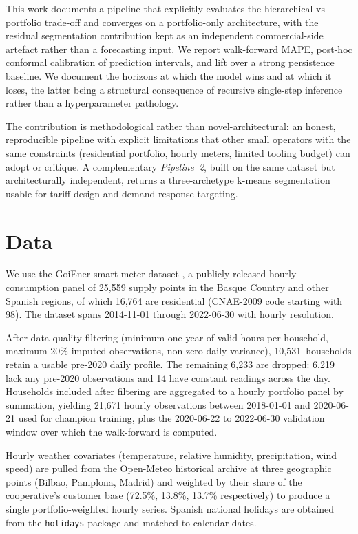 \documentclass[11pt]{article}
\begin{document}
This work documents a pipeline that explicitly evaluates the
hierarchical-vs-portfolio trade-off and converges on a portfolio-only
architecture, with the residual segmentation contribution kept as an
independent commercial-side artefact rather than a forecasting input. We
report walk-forward MAPE, post-hoc conformal calibration of prediction
intervals, and lift over a strong persistence baseline. We document the
horizons at which the model wins and at which it loses, the latter being a
structural consequence of recursive single-step inference rather than a
hyperparameter pathology.

The contribution is methodological rather than novel-architectural: an
honest, reproducible pipeline with explicit limitations that other small
operators with the same constraints (residential portfolio, hourly meters,
limited tooling budget) can adopt or critique. A complementary
\emph{Pipeline~2}, built on the same dataset but architecturally
independent, returns a three-archetype k-means segmentation usable for
tariff design and demand response targeting.

\section{Data}

We use the GoiEner smart-meter dataset \citep{quesada2024goiener},
a publicly released hourly consumption panel of 25,559 supply points in
the Basque Country and other Spanish regions, of which 16,764 are
residential (CNAE-2009 code starting with 98). The dataset spans
2014-11-01 through 2022-06-30 with hourly resolution.

After data-quality filtering (minimum one year of valid hours per
household, maximum 20\% imputed observations, non-zero daily variance),
10,531~households retain a usable pre-2020 daily profile. The remaining
6,233 are dropped: 6,219 lack any pre-2020 observations and 14 have
constant readings across the day. Households included after filtering are
aggregated to a hourly portfolio panel by summation, yielding 21,671
hourly observations between 2018-01-01 and 2020-06-21 used for champion
training, plus the 2020-06-22 to 2022-06-30 validation window over which
the walk-forward is computed.

Hourly weather covariates (temperature, relative humidity, precipitation,
wind speed) are pulled from the Open-Meteo historical archive at three
geographic points (Bilbao, Pamplona, Madrid) and weighted by their share of
the cooperative's customer base (72.5\%, 13.8\%, 13.7\% respectively) to
produce a single portfolio-weighted hourly series. Spanish national
holidays are obtained from the \texttt{holidays} package and matched to
calendar dates.
\end{document}
